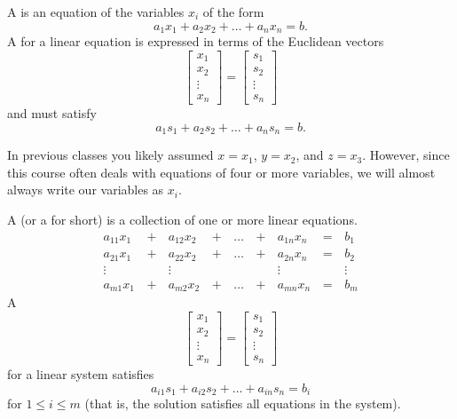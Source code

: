
\begin{applicationActivities}{1}{3}

\begin{definition}
A  is an equation of the variables \(x_i\) of the form
\[
a_1x_1+a_2x_2+\dots+a_nx_n=b
.\]
A 
for a linear equation is expressed in terms of the Euclidean vectors
\[
  \begin{bmatrix}
    x_1 \\
    x_2 \\
    \vdots \\
    x_n
  \end{bmatrix}=
  \begin{bmatrix}
    s_1 \\
    s_2 \\
    \vdots \\
    s_n
  \end{bmatrix}
\]
and must satisfy
\[
a_1s_1+a_2s_2+\dots+a_ns_n=b
.\]
\end{definition}

\begin{remark}
In previous classes you likely assumed \(x=x_1\), \(y=x_2\), and \(z=x_3\).
However, since this course often deals with equations of four or more
variables, we will almost always write our variables as \(x_i\).
\end{remark}

\begin{definition}
A  (or a  for short)
is a collection of one or more linear equations.
  \begin{alignat*}{5}
    a_{11}x_1 &\,+\,& a_{12}x_2 &\,+\,& \dots  &\,+\,& a_{1n}x_n &\,=\,& b_1 \\
    a_{21}x_1 &\,+\,& a_{22}x_2 &\,+\,& \dots  &\,+\,& a_{2n}x_n &\,=\,& b_2 \\
     \vdots&  &\vdots&   &&  &\vdots&&\vdots  \\
    a_{m1}x_1 &\,+\,& a_{m2}x_2 &\,+\,& \dots  &\,+\,& a_{mn}x_n &\,=\,& b_m
  \end{alignat*}
A 
\[
  \begin{bmatrix}
    x_1 \\
    x_2 \\
    \vdots \\
    x_n
  \end{bmatrix}=
  \begin{bmatrix}
    s_1 \\
    s_2 \\
    \vdots \\
    s_n
  \end{bmatrix}
\]
for a linear system satisfies
\[
a_{i1}s_1+a_{i2}s_2+\dots+a_{in}s_n=b_i
\]
for \(1\leq i\leq m\) (that is, the solution satisfies all equations
in the system).
\end{definition}


\end{applicationActivities}
